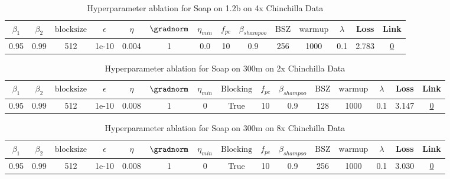 \begin{table}[H]
\centering
\caption{Hyperparameter ablation for Soap on 1.2b on 4x Chinchilla Data}
\label{tab:ablation_soap_1.2b_4}
\begin{tabular}{cccccccccccccc}
\toprule
$\beta_1$ & $\beta_2$ & $\mathrm{block size}$ & $\epsilon$ & $\eta$ & $\gradnorm$ & $\eta_{min}$ & $f_{pc}$ & $\beta_{shampoo}$ & $\mathrm{BSZ}$ & $\mathrm{warmup}$ & $\lambda$ & Loss & Link \\
\midrule
0.95 & 0.99 & 512 & 1e-10 & 0.004 & 1 & 0.0 & 10 & 0.9 & 256 & 1000 & 0.1 & 2.783 & \href{https://wandb.ai/stanford-mercury/optimizer-scaling/runs/sweep-1.2b-96B-soapeweightf321bf579lr0.004-wd0.1-minlr0.0-warmup-7fd4b6}{0} \\
\midrule
\bottomrule
\end{tabular}
\end{table}

\begin{table}[H]
\centering
\caption{Hyperparameter ablation for Soap on 300m on 2x Chinchilla Data}
\label{tab:ablation_soap_300m_2}
\begin{tabular}{ccccccccccccccc}
\toprule
$\beta_1$ & $\beta_2$ & $\mathrm{block size}$ & $\epsilon$ & $\eta$ & $\gradnorm$ & $\eta_{min}$ & $\mathrm{Blocking}$ & $f_{pc}$ & $\beta_{shampoo}$ & $\mathrm{BSZ}$ & $\mathrm{warmup}$ & $\lambda$ & Loss & Link \\
\midrule
0.95 & 0.99 & 512 & 1e-10 & 0.008 & 1 & 0 & True & 10 & 0.9 & 128 & 1000 & 0.1 & 3.147 & \href{https://wandb.ai/stanford-mercury/optimizer-scaling/runs/sweep-300m-12B-soapefe4b166lr0.008-wd0.1-minlr0-warmup1000-b10.9-cebb81}{0} \\
\midrule
\bottomrule
\end{tabular}
\end{table}

\begin{table}[H]
\centering
\caption{Hyperparameter ablation for Soap on 300m on 8x Chinchilla Data}
\label{tab:ablation_soap_300m_8}
\begin{tabular}{ccccccccccccccc}
\toprule
$\beta_1$ & $\beta_2$ & $\mathrm{block size}$ & $\epsilon$ & $\eta$ & $\gradnorm$ & $\eta_{min}$ & $\mathrm{Blocking}$ & $f_{pc}$ & $\beta_{shampoo}$ & $\mathrm{BSZ}$ & $\mathrm{warmup}$ & $\lambda$ & Loss & Link \\
\midrule
0.95 & 0.99 & 512 & 1e-10 & 0.008 & 1 & 0 & True & 10 & 0.9 & 256 & 1000 & 0.1 & 3.030 & \href{https://wandb.ai/stanford-mercury/optimizer-scaling/runs/sweep-300m-48B-soapeae57080lr0.008-wd0.1-minlr0-warmup1000-b10.9-f53d36}{0} \\
\midrule
\bottomrule
\end{tabular}
\end{table}

